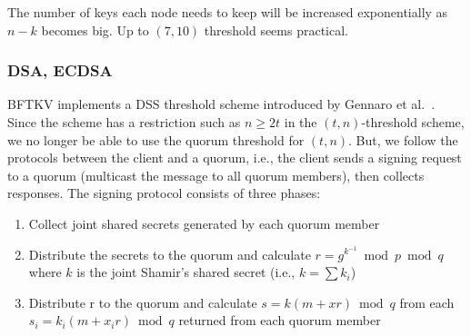 
The number of keys each node needs to keep will be increased
exponentially as $n - k$ becomes big. Up to $(7,10)$ threshold seems
practical.

\subsubsection*{DSA, ECDSA}
BFTKV implements a DSS threshold scheme introduced by Gennaro et
al.\ \cite{Gennaro}.
Since the scheme has a restriction such as $n \geq 2t$ in the $(t,
n)$-threshold scheme, we no longer be able to use the quorum threshold
for $(t, n)$. But, we follow the protocols between the client and a
quorum, i.e., the client sends a signing request to a quorum
(multicast the message to all quorum members), then collects
responses. The signing protocol consists of three phases:
\begin{enumerate}
\item Collect joint shared secrets generated by each quorum member
\item Distribute the secrets to the quorum and calculate
  $r=g^{k^{-1}} \bmod p \bmod q$ where $k$ is the
  joint Shamir's shared secret (i.e., $k = \sum k_i$)
\item Distribute r to the quorum and calculate $s=k(m+xr) \bmod q$
  from each $s_i=k_i(m+x_ir) \bmod q$ returned from each quorum member
\end{enumerate}
